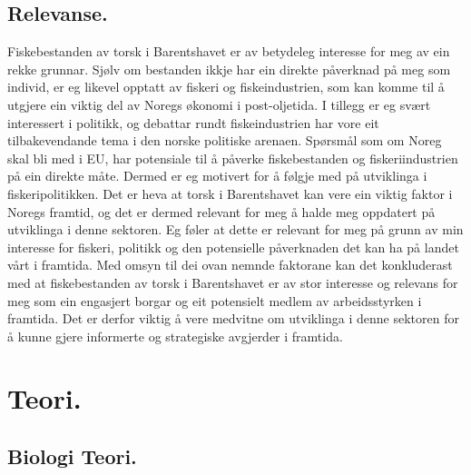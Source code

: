 \documentclass{report}
\begin{document}
\section{Relevanse.}
Fiskebestanden av torsk i Barentshavet er av betydeleg interesse for meg av ein rekke grunnar. Sjølv om bestanden ikkje har ein direkte påverknad på meg som individ, er eg likevel opptatt av fiskeri og fiskeindustrien, som kan komme til å utgjere ein viktig del av Noregs økonomi i post-oljetida.
I tillegg er eg svært interessert i politikk, og debattar rundt fiskeindustrien har vore eit tilbakevendande tema i den norske politiske arenaen. Spørsmål som om Noreg skal bli med i EU, har potensiale til å påverke fiskebestanden og fiskeriindustrien på ein direkte måte. Dermed er eg motivert for å følgje med på utviklinga i fiskeripolitikken.
Det er heva at torsk i Barentshavet kan vere ein viktig faktor i Noregs framtid, og det er dermed relevant for meg å halde meg oppdatert på utviklinga i denne sektoren. Eg føler at dette er relevant for meg på grunn av min interesse for fiskeri, politikk og den potensielle påverknaden det kan ha på landet vårt i framtida.
Med omsyn til dei ovan nemnde faktorane kan det konkluderast med at fiskebestanden av torsk i Barentshavet er av stor interesse og relevans for meg som ein engasjert borgar og eit potensielt medlem av arbeidsstyrken i framtida. Det er derfor viktig å vere medvitne om utviklinga i denne sektoren for å kunne gjere informerte og strategiske avgjerder i framtida.

\chapter{Teori.}
\section{Biologi Teori.}
\end{document}
